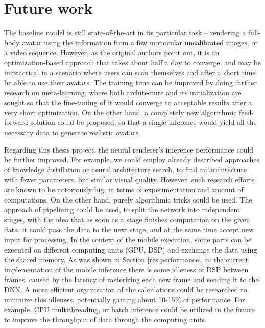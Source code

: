 \section{Future work}\label{res:future}

The baseline model \cite{dnn:stylepeople21} is still state-of-the-art in its particular task -- rendering a full-body avatar using the information from a few monocular uncalibrated images, or a video sequence. However, as the original authors point out, it is an optimization-based approach that takes about half a day to converge, and may be impractical in a scenario where users can scan themselves and after a short time be able to use their avatars. The training time can be improved by doing further research on meta-learning, where both architecture and its initialization are sought so that the fine-tuning of it would converge to acceptable results after a very short optimization. On the other hand, a completely new algorithmic feed-forward solution could be proposed, so that a single inference would yield all the necessary data to generate realistic avatars.

Regarding this thesis project, the neural renderer's inference performance could be further improved. For example, we could employ already described approaches of knowledge distillation or neural architecture search, to find an architecture with fewer parameters, but similar visual quality. However, such research efforts are known to be notoriously big, in terms of experimentation and amount of computations. On the other hand, purely algorithmic tricks could be used. The approach of pipelining \cite{mobile:pipelining20} could be used, to split the network into independent stages, with the idea that as soon as a stage finishes computation on the given data, it could pass the data to the next stage, and at the same time accept new input for processing. In the context of the mobile execution, some parts can be executed on different computing units (GPU, DSP) and exchange the data using the shared memory. As was shown in Section \ref{res:performance}, in the current implementation of the mobile inference there is some idleness of DSP between frames, caused by the latency of rasterizing each new frame and sending it to the DNN. A more efficient organization of the calculations could be researched to minimize this idleness, potentially gaining about 10-15\% of performance. For example, CPU multithreading, or batch inference could be utilized in the future to improve the throughput of data through the computing units.

